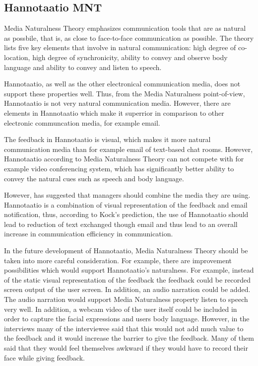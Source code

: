 \documentclass[english,12pt,a4paper,pdftex]{article}
\begin{document}
\subsection{Hannotaatio MNT}

Media Naturalness Theory emphasizes communication tools that are as natural as possbile, that is, as close to face-to-face communication as possible. The theory lists five key elements that involve in natural communication: high degree of co-location, high degree of synchronicity, ability to convey and observe body language and ability to convey and listen to speech.

Hannotaatio, as well as the other electronical communication media, does not support these properties well. Thus, from the Media Naturalness point-of-view, Hannotaatio is not very natural communication media. However, there are elements in Hannotaatio which make it superrior in comparison to other electronic communcation media, for example email.

The feedback in Hannotaatio is visual, which makes it more natural communication media than for example email of text-based chat rooms. However, Hannotaatio according to Media Naturalness Theory can not compete with for example video conferencing system, which has significantly better ability to convey the natural cues such as speech and body language.

However, \citep{kock2007} has suggested that managers should combine the media they are using. Hannotaatio is a combination of visual representation of the feedback and email notification, thus, according to Kock's prediction, the use of Hannotaatio should lead to reduction of text exchanged though email and thus lead to an overall increase in communication efficiency in communication.

In the future development of Hannotaatio, Media Naturalness Theory should be taken into more careful consideration. For example, there are improvement possibilities which would support Hannotaatio's naturalness. For example, instead of the static visual representation of the feedback the feedback could be recorded screen output of the user screen. In addition, an audio narration could be added. The audio narration would support Media Naturalness property listen to speech very well. In addition, a webcam video of the user itself could be included in order to capture the facial expressions and users body language. However, in the interviews many of the interviewee said that this would not add much value to the feedback and it would increase the barrier to give the feedback. Many of them said that they would feel themselves awkward if they would have to record their face while giving feedback. 
\end{document}
